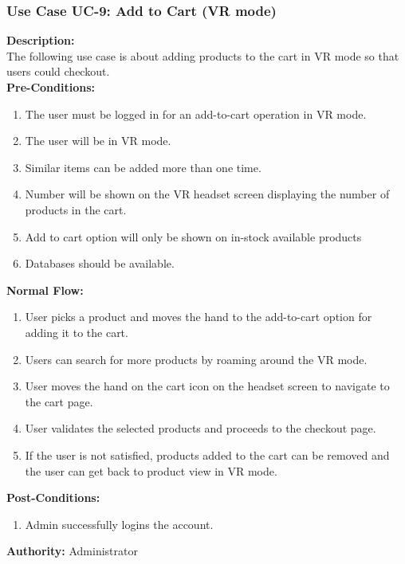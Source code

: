 \subsubsection{Use Case UC-9: Add to Cart (VR mode) }
\textbf{Description:}\\
The following use case is about adding products to the cart in VR mode so that users could checkout. \\
\textbf{Pre-Conditions:}
\begin{enumerate}
    \item The user must be logged in for an add-to-cart operation in VR mode.
\item The user will be in VR mode.
 \item Similar items can be added more than one time. 
 \item Number will be shown on the VR headset screen displaying the number of products in the cart.
 \item Add to cart option will only be shown on in-stock available products
 \item Databases should be available. \end{enumerate}
\textbf{Normal Flow:}\\
\begin{enumerate}
\item User picks a product and moves the hand to the add-to-cart option for adding it to the cart. 
\item Users can search for more products by roaming around the VR mode. 
\item User moves the hand on the cart icon on the headset screen to navigate to the cart page. 
\item User validates the selected products and proceeds to the checkout page. 
\item If the user is not satisfied, products added to the cart can be removed and the user can get back to product view in VR mode. 
\end{enumerate}
\textbf{Post-Conditions: }
\begin{enumerate}
\item	Admin successfully logins the account. 
\end{enumerate}
\textbf{Authority:}
Administrator

